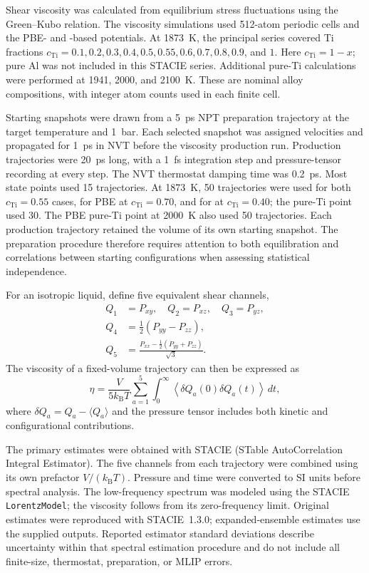 Shear viscosity was calculated from equilibrium stress fluctuations using the Green--Kubo relation.
The viscosity simulations used 512-atom periodic cells and the PBE- and \rscan{}-based potentials.
At 1873~K, the principal series covered Ti fractions
$c_{\mathrm{Ti}}=0.1,0.2,0.3,0.4,0.5,0.55,0.6,0.7,0.8,0.9$, and $1$.
Here $c_{\mathrm{Ti}}=1-x$; pure Al was not included in this STACIE series.
Additional pure-Ti calculations were performed at 1941, 2000, and 2100~K.
These are nominal alloy compositions, with integer atom counts used in each finite cell.

Starting snapshots were drawn from a 5~ps NPT preparation trajectory at the target temperature and 1~bar.
Each selected snapshot was assigned velocities and propagated for 1~ps in NVT before the viscosity production run.
Production trajectories were 20~ps long, with a 1~fs integration step and pressure-tensor recording at every step.
The NVT thermostat damping time was 0.2~ps.
Most state points used 15 trajectories.
At 1873~K, 50 trajectories were used for both $c_{\mathrm{Ti}}=0.55$ cases, for PBE at $c_{\mathrm{Ti}}=0.70$, and for \rscan{} at $c_{\mathrm{Ti}}=0.40$; the \rscan{} pure-Ti point used 30.
The PBE pure-Ti point at 2000~K also used 50 trajectories.
Each production trajectory retained the volume of its own starting snapshot.
The preparation procedure therefore requires attention to both equilibration and correlations between starting configurations when assessing statistical independence.

For an isotropic liquid, define five equivalent shear channels,
\begin{align}
 Q_1&=P_{xy},\quad Q_2=P_{xz},\quad Q_3=P_{yz},\nonumber\\
 Q_4&=\tfrac12(P_{yy}-P_{zz}),\nonumber\\
 Q_5&=\frac{P_{xx}-\tfrac12(P_{yy}+P_{zz})}{\sqrt{3}}.
\end{align}
The viscosity of a fixed-volume trajectory can then be expressed as
\begin{equation}
 \eta=\frac{V}{5k_{\mathrm B}T}\sum_{a=1}^{5}
 \int_0^\infty
 \left\langle\delta Q_a(0)\delta Q_a(t)\right\rangle\,dt,
 \label{eq:viscosity}
\end{equation}
where $\delta Q_a=Q_a-\langle Q_a\rangle$ and the pressure tensor includes both kinetic and configurational contributions.

The primary estimates were obtained with STACIE (STable AutoCorrelation Integral Estimator).\cite{Toraman2025}
The five channels from each trajectory were combined using its own prefactor $V/(k_{\mathrm B}T)$.
Pressure and time were converted to SI units before spectral analysis.
The low-frequency spectrum was modeled using the STACIE \texttt{LorentzModel}; the viscosity follows from its zero-frequency limit.
Original estimates were reproduced with STACIE~1.3.0; expanded-ensemble estimates use the supplied outputs.
Reported estimator standard deviations describe uncertainty within that spectral estimation procedure and do not include all finite-size, thermostat, preparation, or MLIP errors.

